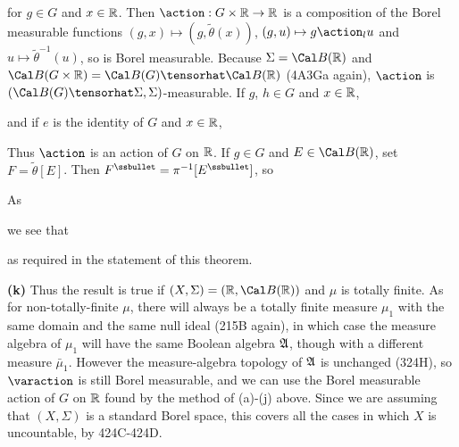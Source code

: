 {

\noindent for $g\in G$ and $x\in\Bbb R$.   Then
$\action:G\times\Bbb R\to\Bbb R$ is a composition of the Borel measurable
functions $(g,x)\mapsto(g,\tilde\theta(x))$, $(g,u)\mapsto g\action_lu$ and
$u\mapsto\tilde\theta^{-1}(u)$, so is Borel measurable.
Because $\Sigma=\Cal B(\Bbb R)$ and
$\Cal B(G\times\Bbb R)=\Cal B(G)\tensorhat\Cal B(\Bbb R)$ (4A3Ga again),
$\action$ is $(\Cal B(G)\tensorhat\Sigma,\Sigma)$-measurable.   If $g$,
$h\in G$ and $x\in\Bbb R$,


\noindent and if $e$ is the identity of $G$ and $x\in\Bbb R$,


\noindent Thus $\action$ is an action of $G$ on $\Bbb R$.   If
$g\in G$ and $E\in\Cal B(\Bbb R)$, set $F=\tilde\theta[E]$.   Then
$F^{\ssbullet}=\pi^{-1}[E^{\ssbullet}]$, so


\noindent As


\noindent we see that


\noindent as required in the statement of this theorem.

\medskip

{\bf (k)} Thus the result is true if
$(X,\Sigma)=(\Bbb R,\Cal B(\Bbb R))$ and $\mu$ is totally finite.   As for
non-totally-finite $\mu$, there will always be a totally finite measure
$\mu_1$ with the same domain and the same null ideal (215B again), in which
case the measure algebra of $\mu_1$ will have the same Boolean algebra
$\frak A$, though with a different measure $\bar\mu_1$.   However the
measure-algebra topology of $\frak A$ is unchanged (324H), so
$\varaction$ is still Borel measurable, and we can use the Borel
measurable action of $G$ on $\Bbb R$ found by the method of (a)-(j) above.
Since we are assuming that $(X,\Sigma)$ is a standard Borel space,
this covers all the cases in which $X$ is uncountable, by 424C-424D.

}
